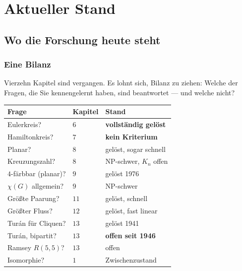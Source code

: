 \part{Aktueller Stand}

\chapter{Wo die Forschung heute steht}

\section{Eine Bilanz}

Vierzehn Kapitel sind vergangen. Es lohnt sich, Bilanz zu ziehen: Welche der Fragen, die Sie kennengelernt haben, sind beantwortet --- und welche nicht?

\begin{merksatz}
\begin{center}
{\small
\renewcommand{\arraystretch}{1.45}
\begin{tabular}{@{}P{3.4cm}P{2.2cm}P{2.8cm}@{}}
\toprule
\textbf{Frage} & \textbf{Kapitel} & \textbf{Stand}\\
\midrule
Eulerkreis? & $6$ & \textcolor{gruen}{\textbf{vollständig gelöst}}\\
Hamiltonkreis? & $7$ & \textcolor{akzent}{\textbf{kein Kriterium}}\\
Planar? & $8$ & \textcolor{gruen}{gelöst, sogar schnell}\\
Kreuzungszahl? & $8$ & \textcolor{akzent}{NP-schwer, $K_n$ offen}\\
$4$-färbbar (planar)? & $9$ & \textcolor{gruen}{gelöst 1976}\\
$\chi(G)$ allgemein? & $9$ & \textcolor{akzent}{NP-schwer}\\
Größte Paarung? & $11$ & \textcolor{gruen}{gelöst, schnell}\\
Größter Fluss? & $12$ & \textcolor{gruen}{gelöst, fast linear}\\
Turán für Cliquen? & $13$ & \textcolor{gruen}{gelöst 1941}\\
Turán, bipartit? & $13$ & \textcolor{akzent}{\textbf{offen seit 1946}}\\
Ramsey $R(5,5)$? & $13$ & \textcolor{akzent}{offen}\\
Isomorphie? & $1$ & \textcolor{mittel}{Zwischenzustand}\\
\bottomrule
\end{tabular}}
\end{center}

\begin{center}
\begin{minipage}{0.88\textwidth}
\end{minipage}
\end{center}
\end{merksatz}

